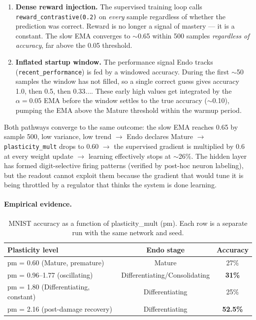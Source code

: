 \begin{enumerate}
  \item \textbf{Dense reward injection.} The supervised training loop calls \texttt{reward\_contrastive(0.2)} on \emph{every} sample regardless of whether the prediction was correct. Reward is no longer a signal of mastery --- it is a constant. The slow EMA converges to $\sim$0.65 within 500 samples \emph{regardless of accuracy}, far above the 0.05 threshold.
  \item \textbf{Inflated startup window.} The performance signal Endo tracks (\texttt{recent\_performance}) is fed by a windowed accuracy. During the first $\sim$50 samples the window has not filled, so a single correct guess gives accuracy 1.0, then 0.5, then 0.33$\ldots$. These early high values get integrated by the $\alpha = 0.05$ EMA before the window settles to the true accuracy ($\sim$0.10), pumping the EMA above the Mature threshold within the warmup period.
\end{enumerate}

Both pathways converge to the same outcome: the slow EMA reaches 0.65 by sample 500, low variance, low trend $\to$ Endo declares Mature $\to$ \texttt{plasticity\_mult} drops to 0.60 $\to$ the supervised gradient is multiplied by 0.6 at every weight update $\to$ learning effectively stops at $\sim$26\%. The hidden layer has formed digit-selective firing patterns (verified by post-hoc neuron labeling), but the readout cannot exploit them because the gradient that would tune it is being throttled by a regulator that thinks the system is done learning.

\paragraph{Empirical evidence.}
\begin{table}[h]
\centering
\caption{MNIST accuracy as a function of plasticity\_mult (pm). Each row is a separate run with the same network and seed.}
\label{tab:plasticity}
\begin{tabular}{lcc}
\toprule
Plasticity level & Endo stage & Accuracy \\
\midrule
pm = 0.60 (Mature, premature)        & Mature                          & 27\% \\
pm = 0.96--1.77 (oscillating)        & Differentiating/Consolidating  & \textbf{31\%} \\
pm = 1.80 (Differentiating, constant) & Differentiating                & 25\% \\
pm = 2.16 (post-damage recovery)      & Differentiating                & \textbf{52.5\%} \\
\bottomrule
\end{tabular}
\end{table}


